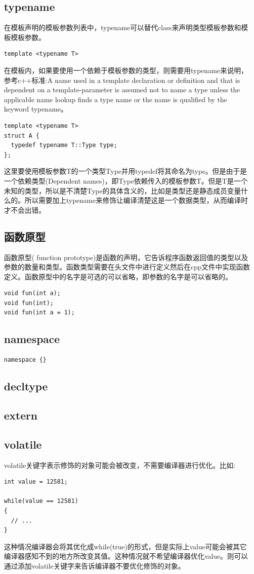\documentclass[12pt]{book}
\begin{document}
\subsection{typename}
在模板声明的模板参数列表中，typename可以替代class来声明类型模板参数和模板模板参数。
\begin{lstlisting}
template <typename T>
\end{lstlisting}
在模板内，如果要使用一个依赖于模板参数的类型，则需要用typename来说明，参考c++标准:A name used in a template declaration or definition and that is dependent on a template-parameter is assumed not to name a type unless the applicable name lookup finds a type name or the name is qualified by the keyword typename。
\begin{lstlisting}
template <typename T>
struct A {
  typedef typename T::Type type;
};
\end{lstlisting}
这里要使用模板参数T的一个类型Type并用typedef将其命名为type。但是由于是一个依赖类型(Dependent names)，即Type依赖传入的模板参数T。但是T是一个未知的类型，所以是不清楚Type的具体含义的，比如是类型还是静态成员变量什么的。所以需要加上typename来修饰让编译清楚这是一个数据类型，从而编译时才不会出错。

\subsection{函数原型}
函数原型( function prototype)是函数的声明，它告诉程序函数返回值的类型以及参数的数量和类型。函数类型需要在头文件中进行定义然后在cpp文件中实现函数定义。函数原型中的名字是可选的可以省略，即参数的名字是可以省略的。
\begin{lstlisting}
void fun(int a);
void fun(int);
void fun(int a = 1);
\end{lstlisting}

\subsection{namespace}
\begin{lstlisting}
namespace {}
\end{lstlisting}

\subsection{decltype}
\subsection{extern}
\subsection{volatile}
volatile关键字表示修饰的对象可能会被改变，不需要编译器进行优化。比如:
\begin{lstlisting}
int value = 12581;

while(value == 12581)
{
  // ...
}
\end{lstlisting}
这种情况编译器会将其优化成while(true)的形式，但是实际上value可能会被其它编译器感知不到的地方所改变其值。这种情况就不希望编译器优化value。则可以通过添加volatile关键字来告诉编译器不要优化修饰的对象。
\end{document}
